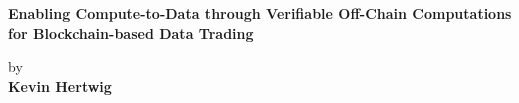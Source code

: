 \begin{titlepage}
	\strut
	\hfill
	\begin{center}
	\vspace{1cm}
		\Huge
		\begin{spacing}{.9}
			\textbf{Enabling Compute-to-Data through Verifiable Off-Chain Computations for Blockchain-based Data Trading}\\
		\end{spacing}
		\vspace{0.8cm}
		\large
		by\\
		\vspace{0.8cm}
		\textbf{Kevin Hertwig}\\
		\vspace{0.8cm}

\end{center}
\end{titlepage}

